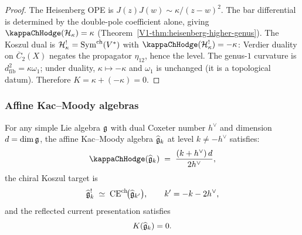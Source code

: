 \begin{proof}
The Heisenberg OPE is $J(z) J(w) \sim \kappa/(z-w)^2$. The bar
differential is determined by the double-pole coefficient alone,
giving $\kappaChHodge(\cH_\kappa) = \kappa$
(Theorem~\ref{V1-thm:heisenberg-higher-genus}).
The Koszul dual is $\mathcal{H}_\kappa^! = \mathrm{Sym}^{\mathrm{ch}}(V^*)$
with $\kappaChHodge(\cH_\kappa^!) = -\kappa$: Verdier duality
on $\overline{C}_2(X)$ negates the propagator $\eta_{12}$, hence
the level. The genus-$1$ curvature is $d_{\mathrm{fib}}^2 = \kappa \omega_1$;
under duality, $\kappa \mapsto -\kappa$ and $\omega_1$ is unchanged
(it is a topological datum). Therefore $K = \kappa + (-\kappa) = 0$.
\end{proof}

\subsubsection{Affine Kac--Moody algebras}

\begin{theorem}
\label{thm:thqg-IV-km-K}
For any simple Lie algebra $\mathfrak{g}$ with dual Coxeter number $h^\vee$
and dimension $d = \dim\mathfrak{g}$, the affine Kac--Moody algebra
$\widehat{\mathfrak{g}}_k$ at level $k \neq -h^\vee$ satisfies:
\begin{equation}%
\kappaChHodge(\widehat{\fg}_k)
\;=\;
\frac{(k + h^\vee)\, d}{2h^\vee},
\end{equation}
the chiral Koszul target is
\[
\widehat{\mathfrak{g}}_k^!
\;\simeq\;
\operatorname{CE}^{\mathrm{ch}}\!\bigl(\widehat{\mathfrak{g}}_{k'}\bigr),
\qquad
k' = -k - 2h^\vee,
\]
and the reflected current presentation satisfies
\begin{equation}%
K(\widehat{\fg}_k) = 0.
\end{equation}
\end{theorem}

